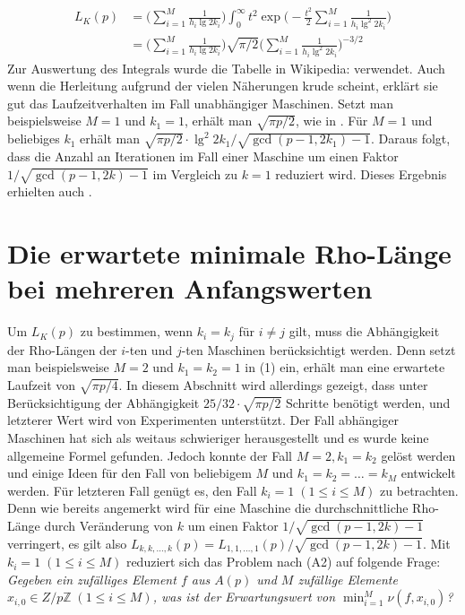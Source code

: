 \documentclass[a4paper, 10pt, ngerman]{article}
\newcommand{\Z}{\mathbb{Z}}
\begin{document}
\begin{align}
    L_K(p)
     & = \Bigg ( \sum_{i = 1}^M \frac 1 {h_i \lg 2k_i} \Bigg ) \int_{0}^{\infty} t^2 \exp \Bigg (- \frac {t^2} 2 \sum_{i = 1}^M \frac 1 {h_i \lg^2 2k_i} \Bigg ) \nonumber \\
     & = \Bigg ( \sum_{i = 1}^M \frac 1 {h_i \lg 2k_i} \Bigg ) \sqrt {\pi/2} \Bigg (\sum_{i = 1}^M \frac 1 {h_i \lg^2 2k_i} \Bigg )^{-3/2}
\end{align}
Zur Auswertung des Integrals wurde die Tabelle in Wikipedia: \cite{gint} verwendet. Auch wenn die Herleitung aufgrund der vielen Näherungen krude scheint, erklärt sie gut das Laufzeitverhalten im Fall unabhängiger Maschinen. Setzt man beispielsweise $M = 1$ und $k_1 = 1$, erhält man $\sqrt{\pi p / 2}$, wie in \cite{pol75}. Für $M = 1$ und beliebiges $k_1$ erhält man $\sqrt{\pi p / 2} \cdot \lg^2 2k_1 / \sqrt{\gcd(p-1, 2k_1) - 1}$. Daraus folgt, dass die Anzahl an Iterationen im Fall einer Maschine um einen Faktor $1/\sqrt{\gcd(p - 1, 2k) - 1}$ im Vergleich zu $k = 1$ reduziert wird. Dieses Ergebnis erhielten auch \cite{bp81}.

\section{Die erwartete minimale Rho-Länge bei mehreren Anfangswerten}

Um $L_K(p)$ zu bestimmen, wenn $k_i = k_j$ für $i \ne j$ gilt, muss die Abhängigkeit der Rho-Längen der $i$-ten und $j$-ten Maschinen berücksichtigt werden. Denn setzt man beispielsweise $M = 2$ und $k_1 = k_2 = 1$ in (1) ein, erhält man eine erwartete Laufzeit von $\sqrt {\pi p / 4}$. In diesem Abschnitt wird allerdings gezeigt, dass unter Berücksichtigung der Abhängigkeit $25/32 \cdot \sqrt{\pi p / 2}$ Schritte benötigt werden, und letzterer Wert wird von Experimenten unterstützt. Der Fall abhängiger Maschinen hat sich als weitaus schwieriger herausgestellt und es wurde keine allgemeine Formel gefunden. Jedoch konnte der Fall $M = 2, k_1 = k_2$ gelöst werden und einige Ideen für den Fall von beliebigem $M$ und $k_1 = k_2 = \dots = k_M$ entwickelt werden. Für letzteren Fall genügt es, den Fall $k_i = 1 \; (1 \le i \le M)$ zu betrachten. Denn wie bereits angemerkt wird für eine Maschine die durchschnittliche Rho-Länge durch Veränderung von $k$ um einen Faktor $1 / \sqrt {\gcd(p - 1, 2k) - 1}$ verringert, es gilt also $L_{k, k, \dots, k}(p) = L_{1, 1, \dots, 1}(p) / \sqrt{\gcd(p - 1, 2k)-1}$. Mit $k_i = 1 \; (1 \le i \le M)$ reduziert sich das Problem nach (A2) auf folgende Frage: \emph{Gegeben ein zufälliges Element $f$ aus $A(p)$ und $M$ zufällige Elemente $x_{i, 0} \in Z/p\Z \; (1 \le i \le M)$, was ist der Erwartungswert von $\min_{i = 1}^M \nu(f, x_{i, 0})$?}
\end{document}
